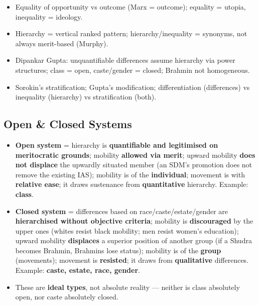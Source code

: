 \begin{QuickRevision}
\begin{itemize}
    \item Equality of opportunity vs outcome (Marx = outcome); equality = utopia, inequality = ideology.
    \item Hierarchy = vertical ranked pattern; hierarchy/inequality = synonyms, not always merit-based (Murphy).
    \item Dipankar Gupta: unquantifiable differences assume hierarchy via power structures; class = open, caste/gender = closed; Brahmin not homogeneous.
    \item Sorokin's stratification; Gupta's modification; differentiation (differences) vs inequality (hierarchy) vs stratification (both).
\end{itemize}
\end{QuickRevision}

\sectiondivider

\subsection{Open \& Closed Systems}

\begin{ComparisonBox}
\begin{itemize}
    \item \textbf{Open system} = hierarchy is \textbf{quantifiable and legitimised on meritocratic grounds}; mobility \textbf{allowed via merit}; upward mobility \textbf{does not displace} the upwardly situated member (an SDM's promotion does not remove the existing IAS); mobility is of the \textbf{individual}; movement is with \textbf{relative ease}; it draws sustenance from \textbf{quantitative} hierarchy. Example: \textbf{class}.
    \item \textbf{Closed system} = differences based on race/caste/estate/gender are \textbf{hierarchised without objective criteria}; mobility is \textbf{discouraged} by the upper ones (whites resist black mobility; men resist women's education); upward mobility \textbf{displaces} a superior position of another group (if a Shudra becomes Brahmin, Brahmins lose status); mobility is of the \textbf{group} (movements); movement is \textbf{resisted}; it draws from \textbf{qualitative} differences. Example: \textbf{caste, estate, race, gender}.
    \item These are \textbf{ideal types}, not absolute reality --- neither is class absolutely open, nor caste absolutely closed.
\end{itemize}
\end{ComparisonBox}

